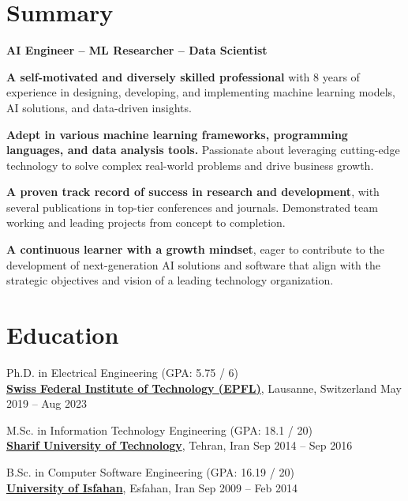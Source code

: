 \documentclass[11pt]{article}
\begin{document}
\maketitle

\section{Summary}

\begin{outerlist}
	\item \textbf{AI Engineer -- ML Researcher -- Data Scientist}
	\begin{innerlist}
		\item \textbf{A self-motivated and diversely skilled professional} with 8 years of experience in designing, developing, and implementing machine learning models, AI solutions, and data-driven insights.
    \item \textbf{Adept in various machine learning frameworks, programming languages, and data analysis tools.} Passionate about leveraging cutting-edge technology to solve complex real-world problems and drive business growth.
    \item \textbf{A proven track record of success in research and development}, with several publications in top-tier conferences and journals. Demonstrated team working and leading projects from concept to completion.
    \item \textbf{A continuous learner with a growth mindset}, eager to contribute to the development of next-generation AI solutions and software that align with the strategic objectives and vision of a leading technology organization.
	\end{innerlist}
\end{outerlist}


\section{Education}
\begin{outerlist}

	\item Ph.D. in Electrical Engineering (GPA: 5.75 / 6)\\
	\href{https://www.epfl.ch/en/home/}{\textbf{Swiss Federal Institute of Technology (EPFL)}}, Lausanne, Switzerland \hfill {May 2019 -- Aug 2023}

	\item M.Sc. in Information Technology Engineering (GPA: 18.1 / 20)\\
	\href{http://www.en.sharif.edu/}{\textbf{Sharif University of Technology}}, Tehran, Iran \hfill {Sep 2014 -- Sep 2016}

	\item B.Sc. in Computer Software Engineering (GPA: 16.19 / 20)\\
	\href{http://ui.ac.ir/EN}{\textbf{University of Isfahan}}, Esfahan, Iran \hfill {Sep 2009 -- Feb 2014}

\end{outerlist}
\end{document}
